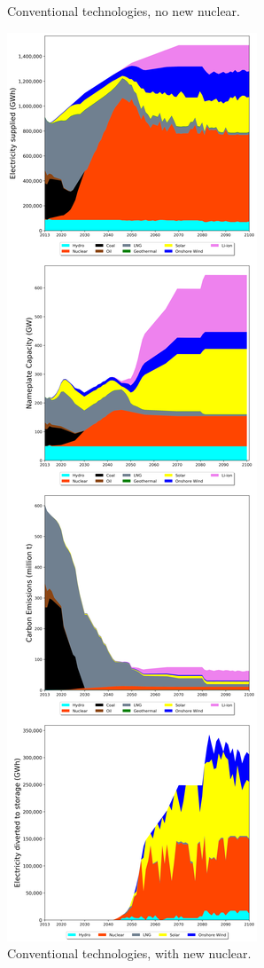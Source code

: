 \begin{figure}[h]
\caption{Conventional technologies, no new nuclear.}
\end{figure}

\begin{figure}[h] 
\centering
\label{scen2}
\includegraphics[scale=0.25]{figures/conv_nuc}
\caption{Conventional technologies, with new nuclear.}
\end{figure}

